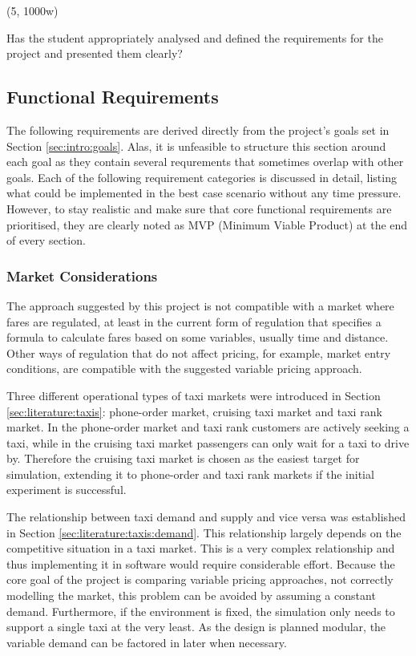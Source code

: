 (5, 1000w)

Has the student appropriately analysed and defined the requirements for the
project and presented them clearly?


\subsection{Functional Requirements}
\label{sec:requirements:simulation}

The following requirements are derived directly from the project's goals set in
Section \ref{sec:intro:goals}. Alas, it is unfeasible to structure this section
around each goal as they contain several requrements that sometimes overlap
with other goals. Each of the following requirement categories is discussed in
detail, listing what could be implemented in the best case scenario without any
time pressure. However, to stay realistic and make sure that core functional
requirements are prioritised, they are clearly noted as MVP (Minimum Viable
Product) at the end of every section.


\subsubsection{Market Considerations}

The approach suggested by this project is not compatible with a market where
fares are regulated, at least in the current form of regulation that specifies
a formula to calculate fares based on some variables, usually time and
distance. Other ways of regulation that do not affect pricing, for example,
market entry conditions, are compatible with the suggested variable pricing
approach.

Three different operational types of taxi markets were introduced in Section
\ref{sec:literature:taxis}: phone-order market, cruising taxi market and taxi
rank market. In the phone-order market and taxi rank customers are actively
seeking a taxi, while in the cruising taxi market passengers can only wait for
a taxi to drive by. Therefore the cruising taxi market is chosen as the easiest
target for simulation, extending it to phone-order and taxi rank markets if the
initial experiment is successful.

The relationship between taxi demand and supply and vice versa was established
in Section \ref{sec:literature:taxis:demand}. This relationship largely depends
on the competitive situation in a taxi market. This is a very complex
relationship and thus implementing it in software would require considerable
effort. Because the core goal of the project is comparing variable pricing
approaches, not correctly modelling the market, this problem can be avoided by
assuming a constant demand. Furthermore, if the environment is fixed, the
simulation only needs to support a single taxi at the very least. As the design
is planned modular, the variable demand can be factored in later when
necessary.

